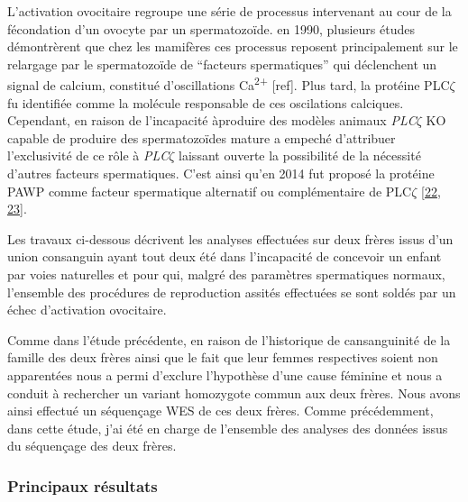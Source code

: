 \documentclass[12pt,twoside]{ugathesis}
\begin{document}
L'activation ovocitaire regroupe une série de processus intervenant au
cour de la fécondation d'un ovocyte par un spermatozoïde. en 1990,
plusieurs études démontrèrent que chez les mamifères ces processus
reposent principalement sur le relargage par le spermatozoïde de
``facteurs spermatiques'' qui déclenchent un signal de calcium,
constitué d'oscillations Ca\textsuperscript{2+} {[}ref{]}. Plus tard, la
protéine PLC\(\zeta\) fu identifiée comme la molécule responsable de ces
oscilations calciques. Cependant, en raison de l'incapacité àproduire
des modèles animaux \emph{PLC}\(\zeta\) KO capable de produire des
spermatozoïdes mature a empeché d'attribuer l'exclusivité de ce rôle à
\emph{PLC}\(\zeta\) laissant ouverte la possibilité de la nécessité
d'autres facteurs spermatiques. C'est ainsi qu'en 2014 fut proposé la
protéine PAWP comme facteur spermatique alternatif ou complémentaire de
PLC\(\zeta\) {[}\protect\hyperlink{ref-Aarabi2014}{22},
\protect\hyperlink{ref-Aarabi2014a}{23}{]}.

Les travaux ci-dessous décrivent les analyses effectuées sur deux frères
issus d'un union consanguin ayant tout deux été dans l'incapacité de
concevoir un enfant par voies naturelles et pour qui, malgré des
paramètres spermatiques normaux, l'ensemble des procédures de
reproduction assités effectuées se sont soldés par un échec d'activation
ovocitaire.

Comme dans l'étude précédente, en raison de l'historique de
cansanguinité de la famille des deux frères ainsi que le fait que leur
femmes respectives soient non apparentées nous a permi d'exclure
l'hypothèse d'une cause féminine et nous a conduit à rechercher un
variant homozygote commun aux deux frères. Nous avons ainsi effectué un
séquençage WES de ces deux frères. Comme précédemment, dans cette étude,
j'ai été en charge de l'ensemble des analyses des données issus du
séquençage des deux frères.

\newpage



\newpage

\subsubsection{Principaux résultats}\label{principaux-resultats-1}
\end{document}
